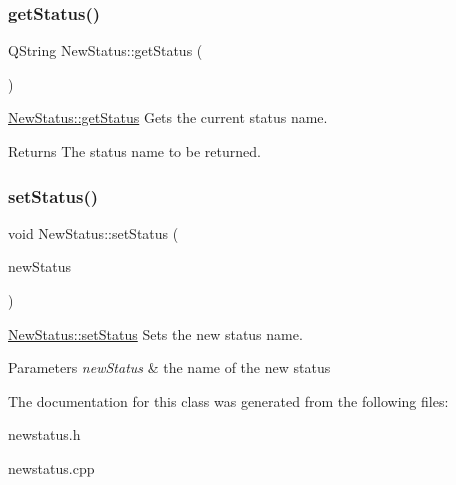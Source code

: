 \subsubsection{\texorpdfstring{get\+Status()}{getStatus()}}
{\footnotesize\ttfamily Q\+String New\+Status\+::get\+Status (\begin{DoxyParamCaption}{ }\end{DoxyParamCaption})}



\hyperlink{class_new_status_a7ea744ad1645c5954000983d50947154}{New\+Status\+::get\+Status} Gets the current status name. 

\begin{DoxyReturn}{Returns}
The status name to be returned. 
\end{DoxyReturn}
\mbox{\label{class_new_status_a861326c3b5c45040b933e4e65a4646e2}} 
\subsubsection{\texorpdfstring{set\+Status()}{setStatus()}}
{\footnotesize\ttfamily void New\+Status\+::set\+Status (\begin{DoxyParamCaption}\item[{Q\+String}]{new\+Status }\end{DoxyParamCaption})}



\hyperlink{class_new_status_a861326c3b5c45040b933e4e65a4646e2}{New\+Status\+::set\+Status} Sets the new status name. 


\begin{DoxyParams}{Parameters}
{\em new\+Status} & the name of the new status \\
\hline
\end{DoxyParams}


The documentation for this class was generated from the following files\+:\begin{DoxyCompactItemize}
\item 
newstatus.\+h\item 
newstatus.\+cpp\end{DoxyCompactItemize}
